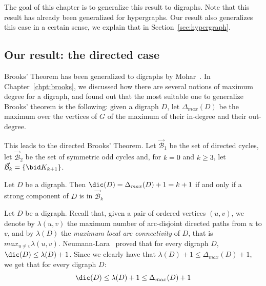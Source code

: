 The goal of this chapter is to generalize this result to digraphs. 
Note that this result has already been generalized for hypergraphs. Our result also generalizes this case in a certain sense, we explain that in Section~\ref{sec:hypergraph}. 



\subsection{Our result: the directed case}\label{sec:our_result}


Brooks' Theorem has been generalized to digraphs by Mohar~\cite{M10}.
In Chapter~\ref{chpt:brooks}, we discussed how there are several notions of maximum degree for a digraph, and found out that the most suitable one to generalize Brooks' theorem is the following: given a digraph $D$, let $\Delta_{max}(D)$ be the maximum over the vertices of $G$ of the maximum of their in-degree and their out-degree. 


This leads to the directed Brooks' Theorem.
Let  $\vec{\mathcal B}_1$ be the set of directed cycles,  let $\vec{\mathcal B}_2$ be the set of symmetric odd cycles and, for $k=0$ and $k \geq 3$, let  $\vec{\mathcal B}_k = \{\bid K_{k+1}\}$. 

\begin{theorem}\label{thm:dir_brooks}
Let $D$ be a digraph. Then $\dic(D) = \Delta_{max}(D) + 1=k+1$ if and only if a strong component of $D$ is in  $\vec{\mathcal B}_k$
\end{theorem}

Let $D$ be a digraph. Recall that, given a pair of ordered vertices $(u,v)$, we denote by $\lambda(u,v)$ the maximum number of arc-disjoint directed paths from $u$ to $v$, and by $\lambda(D)$ the \emph{maximum local arc connectivity} of $D$, that is $max_{u\neq v}\lambda(u,v)$. 
Neumann-Lara~\cite{NL82} proved that for every digraph $D$, $\dic(D) \leq \lambda(D) + 1$. 
Since we clearly have that $\lambda(D) + 1 \leq \Delta_{max}(D) + 1$, we get that for every digraph $D$: 
$$ \dic(D) \leq \lambda(D) + 1 \leq \Delta_{max}(D)  + 1 $$

